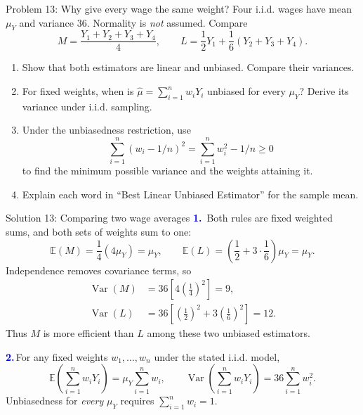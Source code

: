 \documentclass[notes,10pt, aspectratio=169]{beamer}
\newif\ifshowsolutions
\newcommand{\E}{\mathbb{E}}
\newcommand{\Var}{\operatorname{Var}}
\newcommand{\answerpart}[1]{\textcolor{blue}{\textbf{#1.}}\,}
\begin{document}
\begin{frame}{Problem 13: Why give every wage the same weight?}
Four i.i.d. wages have mean $\mu_Y$ and variance $36$. Normality is \emph{not} assumed. Compare
\[
M=\frac{Y_1+Y_2+Y_3+Y_4}{4},\qquad
L=\frac12Y_1+\frac16(Y_2+Y_3+Y_4).
\]
\begin{enumerate}
\setlength{\itemsep}{7pt}
\item Show that both estimators are linear and unbiased. Compare their variances.
\item For fixed weights, when is $\widehat\mu=\sum_{i=1}^n w_iY_i$ unbiased for every $\mu_Y$? Derive its variance under i.i.d. sampling.
\item Under the unbiasedness restriction, use
\[
\sum_{i=1}^n(w_i-1/n)^2=\sum_{i=1}^n w_i^2-1/n\geq0
\]
to find the minimum possible variance and the weights attaining it.
\item Explain each word in ``Best Linear Unbiased Estimator'' for the sample mean.
\end{enumerate}
\end{frame}

\ifshowsolutions
\begin{frame}{Solution 13: Comparing two wage averages}
\small
\answerpart{1}
Both rules are fixed weighted sums, and both sets of weights sum to one:
\[
\E(M)=\frac14(4\mu_Y)=\mu_Y,
\qquad
\E(L)=\left(\frac12+3\cdot\frac16\right)\mu_Y=\mu_Y.
\]
Independence removes covariance terms, so
\[
\begin{aligned}
\Var(M)&=36\left[4\left(\frac14\right)^2\right]=9,\\[3pt]
\Var(L)&=36\left[\left(\frac12\right)^2+3\left(\frac16\right)^2\right]=12.
\end{aligned}
\]
Thus $M$ is more efficient than $L$ among these two unbiased estimators.
\vspace{.15cm}

\answerpart{2}For any fixed weights $w_1,\ldots,w_n$ under the stated i.i.d. model,
\[
\E\left(\sum_{i=1}^n w_iY_i\right)=\mu_Y\sum_{i=1}^n w_i,
\qquad
\Var\left(\sum_{i=1}^n w_iY_i\right)=36\sum_{i=1}^n w_i^2.
\]
Unbiasedness for \emph{every} $\mu_Y$ requires $\sum_{i=1}^n w_i=1$.
\end{frame}
\end{document}
